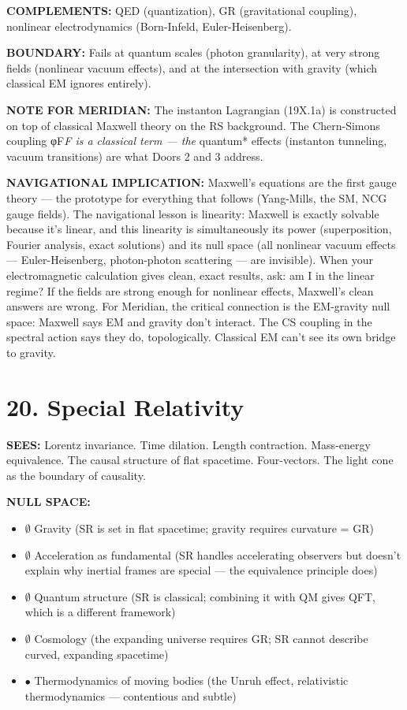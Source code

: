 \textbf{COMPLEMENTS:} QED (quantization), GR (gravitational coupling), nonlinear electrodynamics (Born-Infeld, Euler-Heisenberg).


\textbf{BOUNDARY:} Fails at quantum scales (photon granularity), at very strong fields (nonlinear vacuum effects), and at the intersection with gravity (which classical EM ignores entirely).


\textbf{NOTE FOR MERIDIAN:} The instanton Lagrangian (19X.1a) is constructed on top of classical Maxwell theory on the RS background. The Chern-Simons coupling φF\textit{F is a classical term — the }quantum* effects (instanton tunneling, vacuum transitions) are what Doors 2 and 3 address.


\textbf{NAVIGATIONAL IMPLICATION:} Maxwell's equations are the first gauge theory — the prototype for everything that follows (Yang-Mills, the SM, NCG gauge fields). The navigational lesson is linearity: Maxwell is exactly solvable because it's linear, and this linearity is simultaneously its power (superposition, Fourier analysis, exact solutions) and its null space (all nonlinear vacuum effects — Euler-Heisenberg, photon-photon scattering — are invisible). When your electromagnetic calculation gives clean, exact results, ask: am I in the linear regime? If the fields are strong enough for nonlinear effects, Maxwell's clean answers are wrong. For Meridian, the critical connection is the EM-gravity null space: Maxwell says EM and gravity don't interact. The CS coupling in the spectral action says they do, topologically. Classical EM can't see its own bridge to gravity.


\bigskip\noindent\makebox[\textwidth]{\color{rulegray}\rule{5cm}{0.3pt}}\bigskip


\section*{20. Special Relativity}


\textbf{SEES:} Lorentz invariance. Time dilation. Length contraction. Mass-energy equivalence. The causal structure of flat spacetime. Four-vectors. The light cone as the boundary of causality.


\textbf{NULL SPACE:}

\begin{itemize}[nosep,leftmargin=*]
  \item $\emptyset$ Gravity (SR is set in flat spacetime; gravity requires curvature = GR)
  \item $\emptyset$ Acceleration as fundamental (SR handles accelerating observers but doesn't explain why inertial frames are special — the equivalence principle does)
  \item $\emptyset$ Quantum structure (SR is classical; combining it with QM gives QFT, which is a different framework)
  \item $\emptyset$ Cosmology (the expanding universe requires GR; SR cannot describe curved, expanding spacetime)
  \item $\bullet$ Thermodynamics of moving bodies (the Unruh effect, relativistic thermodynamics — contentious and subtle)
\end{itemize}


